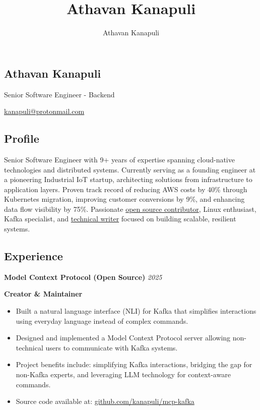 \documentclass[11pt, oneside]{article}
\title{Athavan Kanapuli}
\author{Athavan Kanapuli}
\begin{document}
\begin{center}
\section*{Athavan Kanapuli}
Senior Software Engineer - Backend 

\href{kanapuli@protonmail.com}{kanapuli@protonmail.com}
\end{center}

\subsection*{Profile}

Senior Software Engineer with 9+ years of expertise spanning cloud-native technologies and distributed systems. Currently serving as a founding engineer at a pioneering Industrial IoT startup, architecting solutions from infrastructure to application layers. Proven track record of reducing AWS costs by 40\% through Kubernetes migration, improving customer conversions by 9\%, and enhancing data flow visibility by 75\%. Passionate \href{https://github.com/kanapuli}{open source contributor}, Linux enthusiast, Kafka specialist, and \href{https://medium.com/@athavankanapuli}{technical writer} focused on building scalable, resilient systems.

\medskip
\subsection*{Experience}

\textbf{Model Context Protocol (Open Source)}
\hfill
\textit{2025}

\textbf{Creator \& Maintainer}

\begin{itemize}
  \item Built a natural language interface (NLI) for Kafka that simplifies interactions using everyday language instead of complex commands.
  \item Designed and implemented a Model Context Protocol server allowing non-technical users to communicate with Kafka systems.
  \item Project benefits include: simplifying Kafka interactions, bridging the gap for non-Kafka experts, and leveraging LLM technology for context-aware commands.
  \item Source code available at: \href{https://github.com/kanapuli/mcp-kafka}{github.com/kanapuli/mcp-kafka}
\end{itemize}
\end{document}
